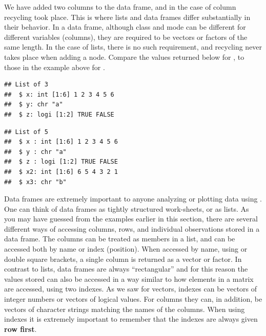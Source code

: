 \documentclass[krantz2]{krantz}\usepackage{knitr}
\begin{document}
We have added two columns to the data frame, and in the case of column  recycling took place. This is where lists and data frames differ substantially in their behavior. In a data frame, although class and mode can be different for different variables (columns), they are required to be vectors or factors of the same length. In the case of lists, there is no such requirement, and recycling never takes place when adding a node. Compare the values returned below for , to those in the example above for .

\begin{knitrout}\footnotesize
{}\color{fgcolor}\begin{kframe}
\begin{alltt}
 \hlkwb{<-} \hlstd{(} \hlstd{=} \hlopt{:}\hlstd{,}  \hlstd{=} \hlstd{,}  \hlstd{=} \hlstd{(}\hlstd{,} \hlstd{))}
\end{alltt}
\begin{verbatim}
## List of 3
##  $ x: int [1:6] 1 2 3 4 5 6
##  $ y: chr "a"
##  $ z: logi [1:2] TRUE FALSE
\end{verbatim}
\begin{alltt}
\hlopt{$} \hlkwb{<-} \hlopt{:}
\hlopt{$} \hlkwb{<-} 
\end{alltt}
\begin{verbatim}
## List of 5
##  $ x : int [1:6] 1 2 3 4 5 6
##  $ y : chr "a"
##  $ z : logi [1:2] TRUE FALSE
##  $ x2: int [1:6] 6 5 4 3 2 1
##  $ x3: chr "b"
\end{verbatim}
\end{kframe}
\end{knitrout}

Data frames are extremely important to anyone analyzing or plotting data using \Rlang. One can think of data frames as tightly structured work-sheets, or as lists. As you may have guessed from the examples earlier in this section, there are several different ways of accessing columns, rows, and individual observations stored in a data frame. The columns can be treated as members in a list, and can be accessed both by name or index (position). When accessed by name, using \Roperator{\$} or double square brackets, a single column is returned as a vector or factor. In contrast to lists, data frames are always ``rectangular'' and for this reason the values stored can also be accessed in a way similar to how elements in a matrix are accessed, using two indexes. As we saw for vectors, indexes can be vectors of integer numbers or vectors of logical values. For columns they can, in addition, be vectors of character strings matching the names of the columns. When using indexes it is extremely important to remember that the indexes are always given \textbf{row first}.
\end{document}
